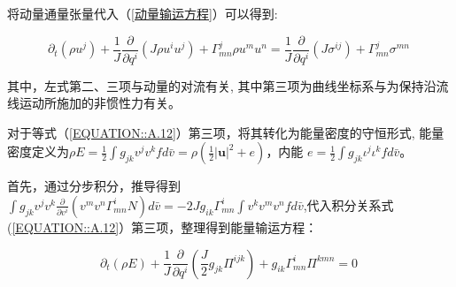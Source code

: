 \documentclass[LBMDerivation.tex]{subfiles}
\begin{document}
将动量通量张量代入（\ref{动量输运方程}）可以得到:

\begin{equation}
  \boxed{
    \partial_{t}\left(\rho u^{j}\right)+\frac{1}{J} \frac{\partial}{\partial q^{i}}\left(J \rho u^{i} u^{j} \right)+\Gamma_{mn}^{j} \rho u^{m} u^{n}
    = \frac{1}{J} \frac{\partial}{\partial q^{i}}\left(J \sigma^{ij} \right) + \Gamma_{mn}^{j} \sigma^{mn} }
  \label{动量方程输运形式} ~
\end{equation}
%



其中，左式第二、三项与动量的对流有关, 其中第三项为曲线坐标系与为保持沿流线运动所施加的非惯性力有关。
%
%

对于等式（\ref{EQUATION::A.12}）第三项，将其转化为能量密度的守恒形式, 能量密度定义为$\rho E= \frac{1}{2}\int g_{jk} v^{j}v^{k} f d\bar{v} =\rho (\frac{1}{2}|\boldsymbol{u}|^2+e)$，内能 $e=\frac{1}{2}\int g_{jk} \iota^{j} \iota^{k} f  d \bar{v}$。

首先，通过分步积分，推导得到$\int g_{jk} v^{j}v^{k}  \frac{\partial}{\partial v^{i}}\left( v^{m} v^{n} \Gamma_{mn}^{i} N\right)d \bar{v}=-2Jg_{ik} \Gamma_{mn}^i \int  v^k v^mv^n  f d \bar{v}$,代入积分关系式(\ref{EQUATION::A.12}）第三项，整理得到能量输运方程：

\begin{equation}
  \boxed{
  \partial_{t}\left(\rho E\right)  + \frac{1}{J} \frac{\partial}{\partial q^{i}}\left( \frac{J}{2} g_{jk}\Pi^{i j k} \right) + g_{ik} \Gamma^i_{mn} \Pi^{kmn} =0
  }
  \label{能量输运1} ~
\end{equation}
%





%

\end{document}
